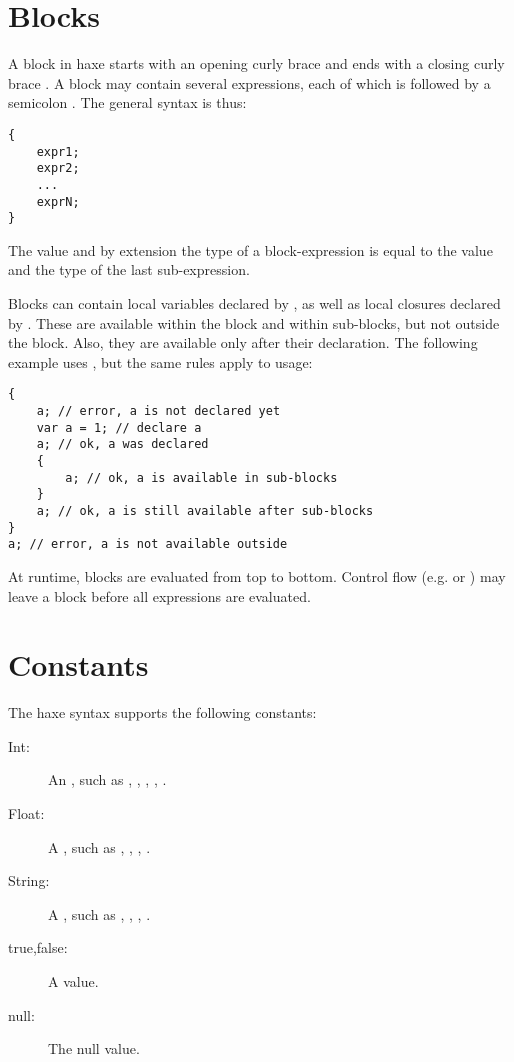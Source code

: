 \documentclass{haxe}
\begin{document}
\section{Blocks}
\label{expression-block}

A block in haxe starts with an opening curly brace \expr{\{} and ends with a closing curly brace \expr{\}}. A block may contain several expressions, each of which is followed by a semicolon \expr{;}. The general syntax is thus:

\begin{lstlisting}
{
	expr1;
	expr2;
	...
	exprN;
}
\end{lstlisting}
The value and by extension the type of a block-expression is equal to the value and the type of the last sub-expression.

Blocks can contain local variables declared by , as well as local closures declared by . These are available within the block and within sub-blocks, but not outside the block. Also, they are available only after their declaration. The following example uses , but the same rules apply to  usage:

\begin{lstlisting}
{
	a; // error, a is not declared yet
	var a = 1; // declare a
	a; // ok, a was declared
	{
		a; // ok, a is available in sub-blocks
	}
	a; // ok, a is still available after sub-blocks
}
a; // error, a is not available outside
\end{lstlisting}
At runtime, blocks are evaluated from top to bottom. Control flow (e.g.  or ) may leave a block before all expressions 
are evaluated.


\section{Constants}
\label{expression-constants}

The haxe syntax supports the following constants:

\begin{description}
	\item[Int:] An , such as , , , , .
	\item[Float:] A , such as , , , .
	\item[String:] A , such as , , , .
	\item[true,false:] A  value.
	\item[null:] The null value.
\end{description}
\end{document}
